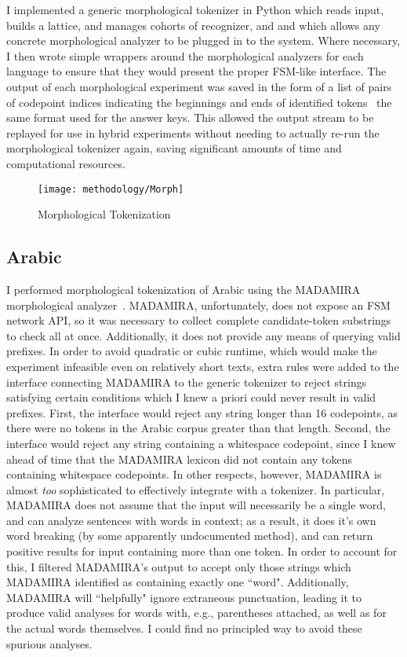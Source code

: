 I implemented a generic morphological tokenizer in Python which reads input, builds a lattice, and manages cohorts of recognizer, and and which allows any concrete morphological analyzer to be plugged in to the system. Where necessary, I then wrote simple wrappers around the morphological analyzers for each language to ensure that they would present the proper FSM-like interface.
The output of each morphological experiment was saved in the form of a list of pairs of codepoint indices indicating the beginnings and ends of identified tokens\textemdash~ the same format used for the answer keys. This allowed the output stream to be replayed for use in hybrid experiments without needing to actually re-run the morphological tokenizer again, saving significant amounts of time and computational resources.

\begin{figure}[ht!]
	\texttt{[image: methodology/Morph]}
	\caption{Morphological Tokenization}
	\label{morphdiagram}
\end{figure}

\subsection{Arabic}
I performed morphological tokenization of Arabic using the MADAMIRA morphological analyzer~\cite{pasha14}. MADAMIRA, unfortunately, does not expose an FSM network API, so it was necessary to collect complete candidate-token substrings to check all at once. Additionally, it does not provide any means of querying valid prefixes. In order to avoid quadratic or cubic runtime, which would make the experiment infeasible even on relatively short texts, extra rules were added to the interface connecting MADAMIRA to the generic tokenizer to reject strings satisfying certain conditions which I knew a priori could never result in valid prefixes. First, the interface would reject any string longer than 16 codepoints, as there were no tokens in the Arabic corpus greater than that length. Second, the interface would reject any string containing a whitespace codepoint, since I knew ahead of time that the MADAMIRA lexicon did not contain any tokens containing whitespace codepoints.
In other respects, however, MADAMIRA is almost \textit{too} sophisticated to effectively integrate with a tokenizer. In particular, MADAMIRA does not assume that the input will necessarily be a single word, and can analyze sentences with words in context; as a result, it does it's own word breaking (by some apparently undocumented method), and can return positive results for input containing more than one token. In order to account for this, I filtered MADAMIRA's output to accept only those strings which MADAMIRA identified as containing exactly one ``word". Additionally, MADAMIRA will ``helpfully" ignore extraneous punctuation, leading it to produce valid analyses for words with, e.g., parentheses attached, as well as for the actual words themselves. I could find no principled way to avoid these spurious analyses.

